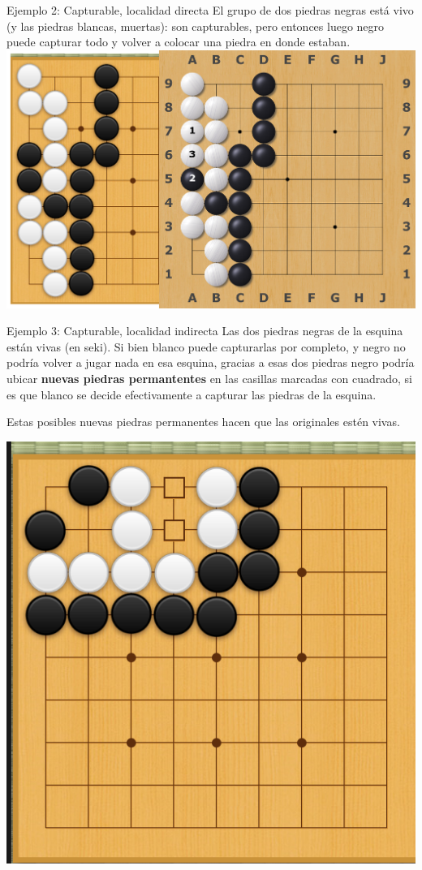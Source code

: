 \documentclass{beamer}
\begin{document}
\begin{frame}{Ejemplo 2: Capturable, localidad directa}
    El grupo de dos piedras negras está vivo (y las piedras blancas, muertas): son capturables, pero entonces luego negro puede capturar todo y volver a colocar una piedra en donde estaban.
    \includegraphics[scale=0.2]{matartodo.png}
\end{frame}

\begin{frame}{Ejemplo 3: Capturable, localidad indirecta}
    Las dos piedras negras de la esquina están vivas (en seki). Si bien blanco puede capturarlas por completo, y negro no podría volver a jugar nada en esa esquina, gracias a esas dos piedras 
     negro podría ubicar \textbf{nuevas piedras permantentes} en las casillas marcadas con cuadrado, si es que blanco se decide efectivamente a capturar las piedras de la esquina. 
     
     Estas posibles
     nuevas piedras permanentes hacen que las originales estén vivas.
    
    \includegraphics[scale=0.3]{capturable2.png}
\end{frame}
\end{document}
